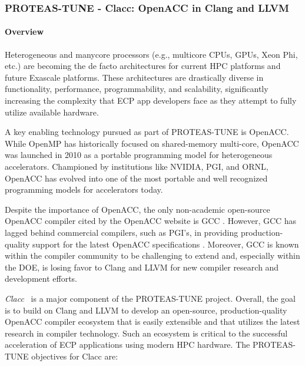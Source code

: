 \subsubsection{ PROTEAS-TUNE - Clacc: OpenACC in Clang and LLVM}\label{s:clacc}


\paragraph{Overview}

Heterogeneous and manycore processors (e.g., multicore CPUs, GPUs,
Xeon Phi, etc.) are becoming the de facto architectures for current
HPC platforms and future Exascale platforms.  These architectures are
drastically diverse in functionality, performance, programmability,
and scalability, significantly increasing the complexity that ECP app
developers face as they attempt to fully utilize available hardware.

A key enabling technology pursued as part of PROTEAS-TUNE is OpenACC.
While OpenMP has historically focused on shared-memory multi-core,
OpenACC was launched in 2010 as a portable programming model for
heterogeneous accelerators.  Championed by institutions like NVIDIA,
PGI, and ORNL, OpenACC has evolved into one of the most portable and
well recognized programming models for accelerators today.

Despite the importance of OpenACC, the only non-academic open-source OpenACC
compiler cited by the OpenACC website is GCC \cite{openaccOrgTools}.
However, GCC has lagged behind commercial compilers, such as PGI's, in
providing production-quality support for the latest OpenACC specifications
\cite{openACCValidationSuite}.  Moreover, GCC is known within the compiler
community to be challenging to extend and, especially within the DOE, is
losing favor to Clang and LLVM for new compiler research and development
efforts.

\textit{Clacc}~\cite{clacc:2018:denny} is a major component of the
PROTEAS-TUNE project.  Overall, the goal is to build on Clang and LLVM
to develop an open-source, production-quality OpenACC compiler
ecosystem that is easily extensible and that utilizes the latest
research in compiler technology.  Such an ecosystem is critical to the
successful acceleration of ECP applications using modern HPC hardware.
The PROTEAS-TUNE objectives for Clacc are:


